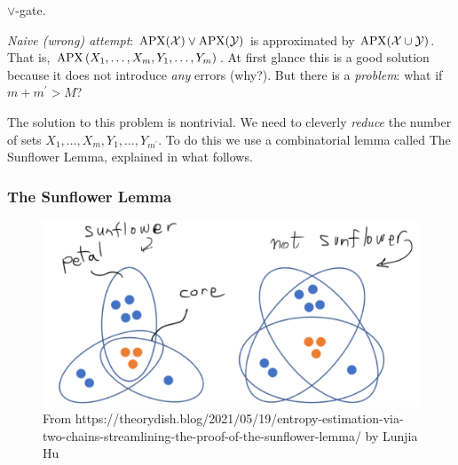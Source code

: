 
 







$\lor$-gate.

\textit{Naive (wrong) attempt}: $\operatorname{\mathrm{APX}}(\mathcal X)
\lor \operatorname{\mathrm{APX}}(\mathcal Y)$ is approximated by $\operatorname{\mathrm{APX}}(\mathcal X \cup \mathcal Y)$. That is, $\operatorname{\mathrm{APX}}\left(X_1, \ldots, X_m, Y_1, \ldots, Y_m\right)$. At first glance this is a good solution because it does not introduce \emph{any} errors (why?). But there is a \textit{problem}: what if $m+m^{\prime}>M$?


The solution to this problem is nontrivial. We need to cleverly \emph{reduce} the number of sets $X_1, \ldots, X_m, Y_1, \ldots, Y_{m^{\prime}}$. To do this we use a combinatorial lemma called The Sunflower Lemma, explained in what follows. 

\subsubsection{The Sunflower Lemma}

\begin{figure}
    \centering
        \includegraphics[width=0.75\linewidth]{images/sunflower-lemma.png}
    \caption{From https://theorydish.blog/2021/05/19/entropy-estimation-via-two-chains-streamlining-the-proof-of-the-sunflower-lemma/ by Lunjia Hu}
    \label{fig:enter-label}
\end{figure}



